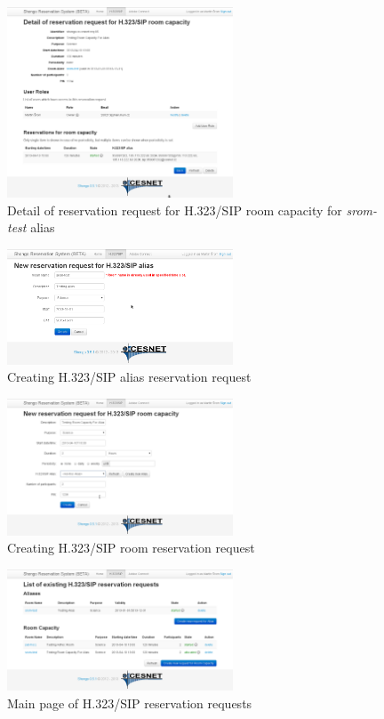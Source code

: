 \begin{enumerate}
\begin{figure}[ht!]
\centering\includegraphics[width=0.6\textwidth]{images/client_web_detail_alias_room.png}
\caption{Detail of reservation request for H.323/SIP room capacity for \textit{srom-test} alias}
\label{fig:client-web-detail-alias-room}
\end{figure}

\end{enumerate}

\begin{figure}[ht!]
\centering\includegraphics[width=0.6\textwidth]{images/client_web_create_alias.png}
\caption{Creating H.323/SIP alias reservation request}
\label{fig:client-web-create-alias}
\end{figure}

\begin{figure}[ht!]
\centering\includegraphics[width=0.6\textwidth]{images/client_web_create_room.png}
\caption{Creating H.323/SIP room reservation request}
\label{fig:client-web-create-room}
\end{figure}


\begin{figure}[ht!]
\centering\includegraphics[width=0.6\textwidth]{images/client_web_list.png}
\caption{Main page of H.323/SIP reservation requests}
\label{fig:client-web-list}
\end{figure}









